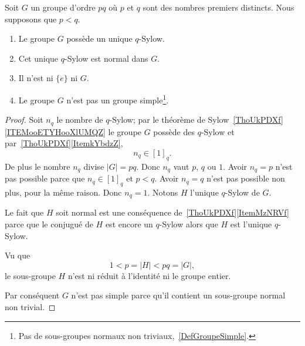 \begin{lemma}
	Soit \( G\) un groupe d'ordre \( pq\) où \( p\) et \( q\) sont des nombres premiers distincts. Nous supposons que \( p<q\).
	\begin{enumerate}
		\item
		      Le groupe \( G\) possède un unique \( q\)-Sylow.
		\item
		      Cet unique \( q\)-Sylow est normal dans \( G\).
		\item
		      Il n'est ni \( \{ e \}\) ni \( G\).
		\item
		      Le groupe \( G\) n'est pas un groupe simple\footnote{Pas de sous-groupes normaux non triviaux,~\ref{DefGroupeSimple}.}.
	\end{enumerate}
\end{lemma}

\begin{proof}
	Soit \( n_q\) le nombre de \( q\)-Sylow; par le théorème de Sylow~\ref{ThoUkPDXf}\ref{ITEMooETYHooXlUMQZ} le groupe \( G\) possède des \( q\)-Sylow et par~\ref{ThoUkPDXf}\ref{ItemkYbdzZ},
	\begin{equation}
		n_q\in[1]_q.
	\end{equation}
	De plus le nombre \( n_q\) divise \( | G |=pq\). Donc \( n_q\) vaut \( p\), \( q\) ou \( 1\). Avoir \( n_q=p\) n'est pas possible parce que \( n_q\in[1]_q\) et \( p<q\). Avoir \( n_q=q\) n'est pas possible non plus, pour la même raison. Donc \( n_q=1\). Notons \( H\) l'unique \( q\)-Sylow de \( G\).

	Le fait que \( H\) soit normal est une conséquence de~\ref{ThoUkPDXf}\ref{ItemMzNRVf} parce que le conjugué de \( H\) est encore un \( q\)-Sylow alors que \( H\) est l'unique \( q\)-Sylow.

	Vu que
	\begin{equation}
		1<p=| H |<pq=| G |,
	\end{equation}
	le sous-groupe \( H \) n'est ni réduit à l'identité ni le groupe entier.

	Par conséquent \( G\) n'est pas simple parce qu'il contient un sous-groupe normal non trivial.
\end{proof}


